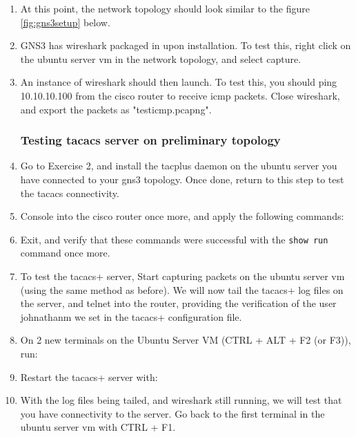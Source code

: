 \documentclass[main.tex]{subfiles}
\begin{document}
\begin{enumerate}[noitemsep,label=$\bullet$,leftmargin=20mm,labelsep=0.5cm]
\item At this point, the network topology should look similar to the figure \ref{fig:gns3setup} below.


\item GNS3 has wireshark packaged in upon installation. To test this, right click on the ubuntu server vm in the network topology, and select capture.

\item An instance of wireshark should then launch. To test this, you should ping 10.10.10.100 from the cisco router to receive icmp packets. Close wireshark, and export the packets as "test\textunderscore icmp.pcapng".

\subsubsection{Testing tacacs server on preliminary topology}

\item Go to Exercise 2, and install the tac\textunderscore plus daemon on the ubuntu server you have connected to your gns3 topology. Once done, return to this step to test the tacacs connectivity.

\item Console into the cisco router once more, and apply the following commands:

\item Exit, and verify that these commands were successful with the \texttt{show run} command once more.

\item To test the tacacs+ server, Start capturing packets on the ubuntu server vm (using the same method as before). We will now tail the tacacs+ log files on the server, and telnet into the router, providing the verification of the user johnathanm we set in the tacacs+ configuration file. 

\item On 2 new terminals on the Ubuntu Server VM (CTRL + ALT + F2 (or F3)), run:

\item Restart the tacacs+ server with:


\item With the log files being tailed, and wireshark still running, we will test that you have connectivity to the server. Go back to the first terminal in the ubuntu server vm with CTRL + F1.


\end{enumerate}
\end{document}

